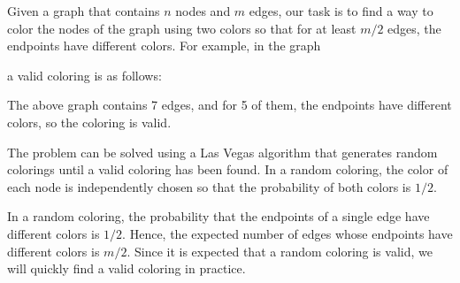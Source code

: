 Given a graph that contains $n$ nodes and $m$ edges,
our task is to find a way to color the nodes
of the graph using two colors so that
for at least $m/2$ edges, the endpoints
have different colors.
For example, in the graph
\begin{center}
\end{center}
a valid coloring is as follows:
\begin{center}
\end{center}
The above graph contains 7 edges, and for 5 of them,
the endpoints have different colors,
so the coloring is valid.

The problem can be solved using a Las Vegas algorithm
that generates random colorings until a valid coloring
has been found.
In a random coloring, the color of each node is
independently chosen so that the probability of
both colors is $1/2$.

In a random coloring, the probability that the endpoints
of a single edge have different colors is $1/2$.
Hence, the expected number of edges whose endpoints
have different colors is $m/2$.
Since it is expected that a random coloring is valid,
we will quickly find a valid coloring in practice.

